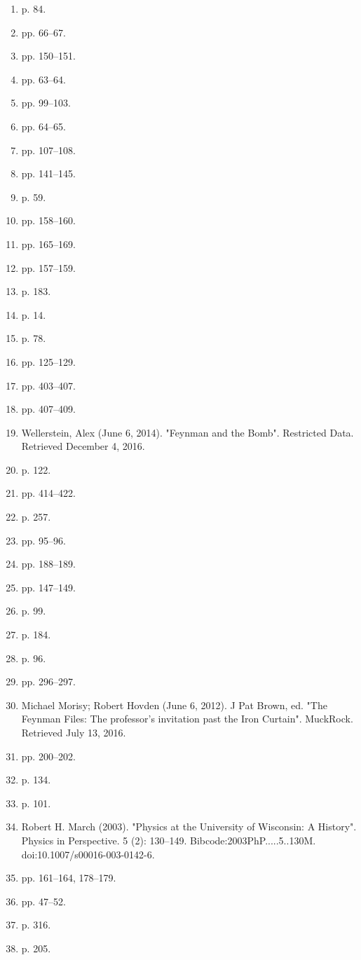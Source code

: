\begin{enumerate}
\item  p. 84.
\item  pp. 66–67.
\item  pp. 150–151.
\item  pp. 63–64.
\item  pp. 99–103.
\item  pp. 64–65.
\item  pp. 107–108.
\item  pp. 141–145.
\item  p. 59.
\item  pp. 158–160.
\item  pp. 165–169.
\item  pp. 157–159.
\item  p. 183.
\item  p. 14.
\item  p. 78.
\item  pp. 125–129.
\item  pp. 403–407.
\item  pp. 407–409.
\item Wellerstein, Alex (June 6, 2014). "Feynman and the Bomb". Restricted Data. Retrieved December 4, 2016.
\item  p. 122.
\item  pp. 414–422.
\item  p. 257.
\item  pp. 95–96.
\item  pp. 188–189.
\item  pp. 147–149.
\item  p. 99.
\item  p. 184.
\item  p. 96.
\item  pp. 296–297.
\item Michael Morisy; Robert Hovden (June 6, 2012). J Pat Brown, ed. "The Feynman Files: The professor's invitation past the Iron Curtain". MuckRock. Retrieved July 13, 2016.
\item  pp. 200–202.
\item  p. 134.
\item  p. 101.
\item Robert H. March (2003). "Physics at the University of Wisconsin: A History". Physics in Perspective. 5 (2): 130–149. Bibcode:2003PhP.....5..130M. doi:10.1007/s00016-003-0142-6.
\item  pp. 161–164, 178–179.
\item  pp. 47–52.
\item  p. 316.
\item  p. 205.

\end{enumerate}

